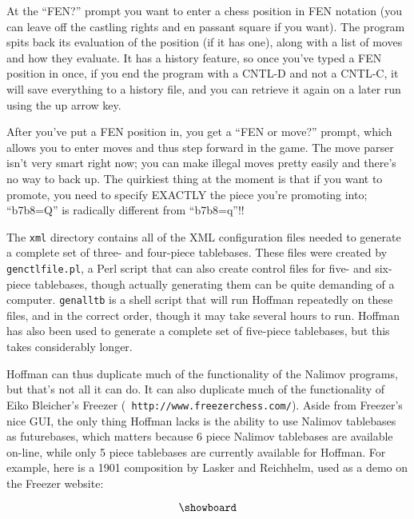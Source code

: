 \documentclass[11pt]{article}
\begin{document}
At the ``FEN?'' prompt you want to enter a chess position in FEN
notation (you can leave off the castling rights and en passant square
if you want).  The program spits back its evaluation of the position
(if it has one), along with a list of moves and how they evaluate.  It
has a history feature, so once you've typed a FEN position in once, if
you end the program with a CNTL-D and not a CNTL-C, it will save
everything to a history file, and you can retrieve it again on a later
run using the up arrow key.

After you've put a FEN position in, you get a ``FEN or move?'' prompt,
which allows you to enter moves and thus step forward in the game.
The move parser isn't very smart right now; you can make illegal moves
pretty easily and there's no way to back up.  The quirkiest thing at
the moment is that if you want to promote, you need to specify EXACTLY
the piece you're promoting into; ``b7b8=Q'' is radically different from
``b7b8=q''!!

The {\tt xml} directory contains all of the XML configuration files
needed to generate a complete set of three- and four-piece tablebases.
These files were created by {\tt genctlfile.pl}, a Perl script that
can also create control files for five- and six-piece tablebases,
though actually generating them can be quite demanding of a computer.
{\tt genalltb} is a shell script that will run Hoffman repeatedly on
these files, and in the correct order, though it may take several
hours to run.  Hoffman has also been used to generate a complete set
of five-piece tablebases, but this takes considerably longer.

Hoffman can thus duplicate much of the functionality of the Nalimov
programs, but that's not all it can do.  It can also duplicate much of
the functionality of Eiko Bleicher's Freezer ({\tt
http://www.freezerchess.com/}).  Aside from Freezer's nice GUI, the
only thing Hoffman lacks is the ability to use Nalimov tablebases as
futurebases, which matters because 6 piece Nalimov tablebases are
available on-line, while only 5 piece tablebases are currently
available for Hoffman.  For example, here is a 1901 composition by
Lasker and Reichhelm, used as a demo on the Freezer website:

$$\showboard$$
\end{document}
